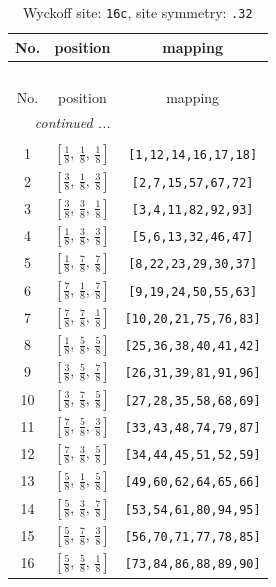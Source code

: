 \documentclass[fleqn,8pt]{jsarticle}
\begin{document}
\begin{longtable}{ccc}
\caption{Wyckoff site: {\tt 16c}, site symmetry: {\tt .32}}
 \\
 \hline \hline
No. & position & mapping \\ \hline \endfirsthead

\multicolumn{2}{l}{\tablename\ \thetable{}} \\
 \hline \hline
No. & position & mapping \\ \hline \endhead

 \hline \hline
\multicolumn{2}{r}{\footnotesize\it continued ...} \\ \endfoot

 \hline \hline
\multicolumn{2}{r}{} \\ \endlastfoot

1 & $\left[ \frac{1}{8},\, \frac{1}{8},\, \frac{1}{8} \right]$ & {\tt [1,12,14,16,17,18]} \\ \hline
2 & $\left[ \frac{3}{8},\, \frac{1}{8},\, \frac{3}{8} \right]$ & {\tt [2,7,15,57,67,72]} \\ \hline
3 & $\left[ \frac{3}{8},\, \frac{3}{8},\, \frac{1}{8} \right]$ & {\tt [3,4,11,82,92,93]} \\ \hline
4 & $\left[ \frac{1}{8},\, \frac{3}{8},\, \frac{3}{8} \right]$ & {\tt [5,6,13,32,46,47]} \\ \hline
5 & $\left[ \frac{1}{8},\, \frac{7}{8},\, \frac{7}{8} \right]$ & {\tt [8,22,23,29,30,37]} \\ \hline
6 & $\left[ \frac{7}{8},\, \frac{1}{8},\, \frac{7}{8} \right]$ & {\tt [9,19,24,50,55,63]} \\ \hline
7 & $\left[ \frac{7}{8},\, \frac{7}{8},\, \frac{1}{8} \right]$ & {\tt [10,20,21,75,76,83]} \\ \hline
8 & $\left[ \frac{1}{8},\, \frac{5}{8},\, \frac{5}{8} \right]$ & {\tt [25,36,38,40,41,42]} \\ \hline
9 & $\left[ \frac{3}{8},\, \frac{5}{8},\, \frac{7}{8} \right]$ & {\tt [26,31,39,81,91,96]} \\ \hline
10 & $\left[ \frac{3}{8},\, \frac{7}{8},\, \frac{5}{8} \right]$ & {\tt [27,28,35,58,68,69]} \\ \hline
11 & $\left[ \frac{7}{8},\, \frac{5}{8},\, \frac{3}{8} \right]$ & {\tt [33,43,48,74,79,87]} \\ \hline
12 & $\left[ \frac{7}{8},\, \frac{3}{8},\, \frac{5}{8} \right]$ & {\tt [34,44,45,51,52,59]} \\ \hline
13 & $\left[ \frac{5}{8},\, \frac{1}{8},\, \frac{5}{8} \right]$ & {\tt [49,60,62,64,65,66]} \\ \hline
14 & $\left[ \frac{5}{8},\, \frac{3}{8},\, \frac{7}{8} \right]$ & {\tt [53,54,61,80,94,95]} \\ \hline
15 & $\left[ \frac{5}{8},\, \frac{7}{8},\, \frac{3}{8} \right]$ & {\tt [56,70,71,77,78,85]} \\ \hline
16 & $\left[ \frac{5}{8},\, \frac{5}{8},\, \frac{1}{8} \right]$ & {\tt [73,84,86,88,89,90]} \\
\end{longtable}
\end{document}
